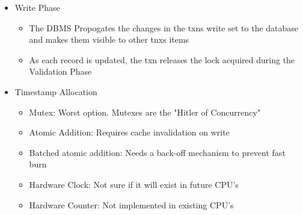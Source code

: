 \documentclass[11pt]{article}
\begin{document}
\begin{itemize}
\begin{itemize}
\begin{itemize}
        \end{itemize}
        \item Write Phase
        \begin{itemize}
            \item The DBMS Propogates the changes in the txns write set to the database and makes them visible to other tnxs
            items
            \item As each record is updated, the txn releases the lock acquired during the Validation Phase
        \end{itemize}
        \item Timestamp Allocation~\cite{p209-yu}
        \begin{itemize}
            \item Mutex: Worst option. Mutexes are the "Hitler of Concurrency"
            \item Atomic Addition: Requires cache invalidation on write
            \item Batched atomic addition: Needs a back-off mechanism to prevent fast burn
            \item Hardware Clock: Not sure if it will exist in future CPU's
            \item Hardware Counter: Not implemented in existing CPU's
        \end{itemize}
    \end{itemize}
\end{itemize}
\end{document}
